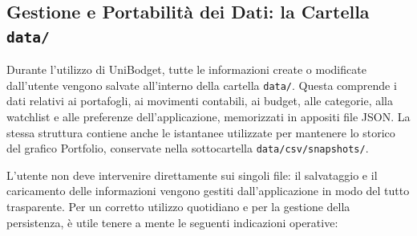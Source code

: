 \documentclass[11pt,a4paper,openright]{report}
\begin{document}
\subsection*{Gestione e Portabilità dei Dati: la Cartella \texttt{data/}}
Durante l'utilizzo di UniBodget, tutte le informazioni create o modificate dall'utente vengono salvate all'interno della cartella \texttt{data/}. 
Questa comprende i dati relativi ai portafogli, ai movimenti contabili, ai budget, alle categorie, alla watchlist e alle preferenze dell'applicazione, memorizzati in appositi file JSON. 
La stessa struttura contiene anche le istantanee utilizzate per mantenere lo storico del grafico Portfolio, conservate nella sottocartella \texttt{data/csv/snapshots/}.

L'utente non deve intervenire direttamente sui singoli file: il salvataggio e il caricamento delle informazioni vengono gestiti dall'applicazione in modo del tutto trasparente. Per un corretto utilizzo quotidiano e per la gestione della persistenza, è utile tenere a mente le seguenti indicazioni operative:
\end{document}
